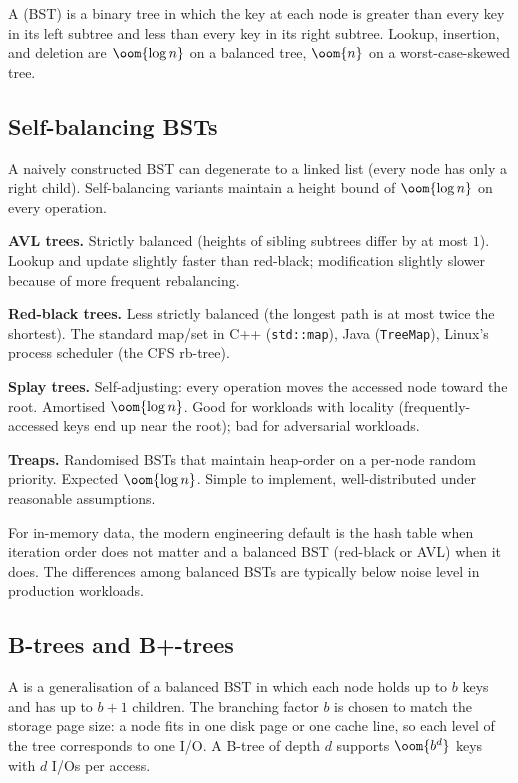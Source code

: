 A  (BST) is a binary tree in which the key at each node is greater than every key in its left subtree and less than every key in its right subtree. Lookup, insertion, and deletion are $\oom{\log n}$ on a balanced tree, $\oom{n}$ on a worst-case-skewed tree.

\subsection{Self-balancing BSTs}

A naively constructed BST can degenerate to a linked list (every node has only a right child). Self-balancing variants maintain a height bound of $\oom{\log n}$ on every operation.

\textbf{AVL trees.} Strictly balanced (heights of sibling subtrees differ by at most $1$). Lookup and update slightly faster than red-black; modification slightly slower because of more frequent rebalancing.

\textbf{Red-black trees.} Less strictly balanced (the longest path is at most twice the shortest). The standard map/set in C++ (\texttt{std::map}), Java (\texttt{TreeMap}), Linux's process scheduler (the CFS rb-tree).

\textbf{Splay trees.} Self-adjusting: every operation moves the accessed node toward the root. Amortised $\oom{\log n}$. Good for workloads with locality (frequently-accessed keys end up near the root); bad for adversarial workloads.

\textbf{Treaps.} Randomised BSTs that maintain heap-order on a per-node random priority. Expected $\oom{\log n}$. Simple to implement, well-distributed under reasonable assumptions.

For in-memory data, the modern engineering default is the hash table when iteration order does not matter and a balanced BST (red-black or AVL) when it does. The differences among balanced BSTs are typically below noise level in production workloads.

\subsection{B-trees and B+-trees}

A  is a generalisation of a balanced BST in which each node holds up to $b$ keys and has up to $b+1$ children. The branching factor $b$ is chosen to match the storage page size: a node fits in one disk page or one cache line, so each level of the tree corresponds to one I/O. A B-tree of depth $d$ supports $\oom{b^d}$ keys with $d$ I/Os per access.

